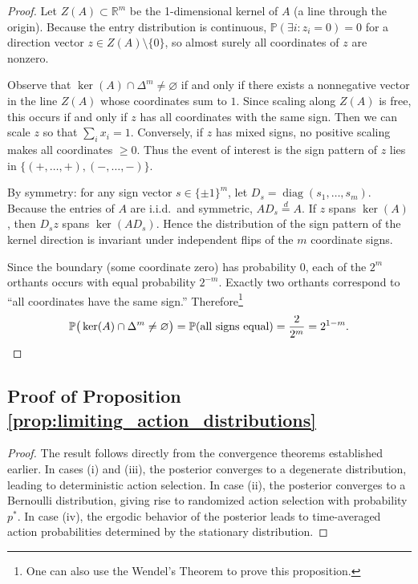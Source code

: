 \documentclass[12pt]{article}
\begin{document}
\begin{proof}
    Let $Z(A) \subset \mathbb{R}^m$ be the 1-dimensional kernel of $A$ (a line through the origin). Because the entry distribution is continuous, $\mathbb{P}(\exists i : z_i = 0) = 0$ for a direction vector $z \in Z(A) \setminus \{0\}$, so almost surely all coordinates of $z$ are nonzero.
    
    Observe that $\ker(A) \cap \Delta^m \neq \varnothing$ if and only if there exists a nonnegative vector in the line $Z(A)$ whose coordinates sum to $1$. Since scaling along $Z(A)$ is free, this occurs if and only if $z$ has all coordinates with the same sign. Then we can scale $z$ so that $\sum_i x_i = 1$. Conversely, if $z$ has mixed signs, no positive scaling makes all coordinates $\geq 0$. Thus the event of interest is the sign pattern of $z$ lies in $\{(+,\ldots,+), (-,\ldots,-)\}$.
    
    By symmetry: for any sign vector $s \in \{\pm 1\}^m$, let $D_s = \operatorname{diag}(s_1, \ldots, s_m)$. Because the entries of $A$ are i.i.d.\ and symmetric, $A D_s \stackrel{d}{=} A$. If $z$ spans $\ker(A)$, then $D_s z$ spans $\ker(A D_s)$. Hence the distribution of the sign pattern of the kernel direction is invariant under independent flips of the $m$ coordinate signs. 
    
    Since the boundary (some coordinate zero) has probability $0$, each of the $2^m$ orthants occurs with equal probability $2^{-m}$. Exactly two orthants correspond to ``all coordinates have the same sign.'' Therefore\footnote{One can also use the Wendel's Theorem to prove this proposition.}
    \[
    \mathbb{P}\big(\ker(A) \cap \Delta^m \neq \varnothing\big) = \mathbb{P}(\text{all signs equal}) = \frac{2}{2^m} = 2^{1-m}. \qedhere
    \]
\end{proof}

\subsection{Proof of Proposition \ref{prop:limiting_action_distributions}}
\begin{proof}
    The result follows directly from the convergence theorems established earlier. In cases (i) and (iii), the posterior converges to a degenerate distribution, leading to deterministic action selection. In case (ii), the posterior converges to a Bernoulli distribution, giving rise to randomized action selection with probability $p^*$. In case (iv), the ergodic behavior of the posterior leads to time-averaged action probabilities determined by the stationary distribution.
    \end{proof}
\end{document}
